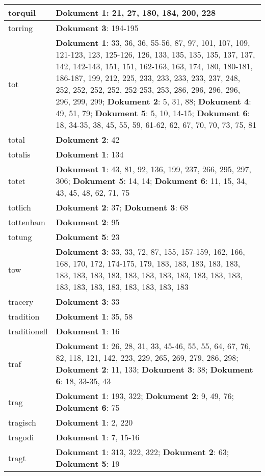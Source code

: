 \documentclass[a5paper]{article}
\begin{document}
\begin{longtable}[l]{|l|p{3in}|}
\hline
torquil & \textbf{Dokument 1}: 21, 27, 180, 184, 200, 228 \\
\hline
torring & \textbf{Dokument 3}: 194-195 \\
\hline
tot & \textbf{Dokument 1}: 33, 36, 36, 55-56, 87, 97, 101, 107, 109, 121-123, 123, 125-126, 126, 133, 135, 135, 135, 137, 137, 142, 142-143, 151, 151, 162-163, 163, 174, 180, 180-181, 186-187, 199, 212, 225, 233, 233, 233, 233, 237, 248, 252, 252, 252, 252, 252-253, 253, 286, 296, 296, 296, 296, 299, 299; \textbf{Dokument 2}: 5, 31, 88; \textbf{Dokument 4}: 49, 51, 79; \textbf{Dokument 5}: 5, 10, 14-15; \textbf{Dokument 6}: 18, 34-35, 38, 45, 55, 59, 61-62, 62, 67, 70, 70, 73, 75, 81 \\
\hline
total & \textbf{Dokument 2}: 42 \\
\hline
totalis & \textbf{Dokument 1}: 134 \\
\hline
totet & \textbf{Dokument 1}: 43, 81, 92, 136, 199, 237, 266, 295, 297, 306; \textbf{Dokument 5}: 14, 14; \textbf{Dokument 6}: 11, 15, 34, 43, 45, 48, 62, 71, 75 \\
\hline
totlich & \textbf{Dokument 2}: 37; \textbf{Dokument 3}: 68 \\
\hline
tottenham & \textbf{Dokument 2}: 95 \\
\hline
totung & \textbf{Dokument 5}: 23 \\
\hline
tow & \textbf{Dokument 3}: 33, 33, 72, 87, 155, 157-159, 162, 166, 168, 170, 172, 174-175, 179, 183, 183, 183, 183, 183, 183, 183, 183, 183, 183, 183, 183, 183, 183, 183, 183, 183, 183, 183, 183, 183, 183, 183, 183 \\
\hline
tracery & \textbf{Dokument 3}: 33 \\
\hline
tradition & \textbf{Dokument 1}: 35, 58 \\
\hline
traditionell & \textbf{Dokument 1}: 16 \\
\hline
traf & \textbf{Dokument 1}: 26, 28, 31, 33, 45-46, 55, 55, 64, 67, 76, 82, 118, 121, 142, 223, 229, 265, 269, 279, 286, 298; \textbf{Dokument 2}: 11, 133; \textbf{Dokument 3}: 38; \textbf{Dokument 6}: 18, 33-35, 43 \\
\hline
trag & \textbf{Dokument 1}: 193, 322; \textbf{Dokument 2}: 9, 49, 76; \textbf{Dokument 6}: 75 \\
\hline
tragisch & \textbf{Dokument 1}: 2, 220 \\
\hline
tragodi & \textbf{Dokument 1}: 7, 15-16 \\
\hline
tragt & \textbf{Dokument 1}: 313, 322, 322; \textbf{Dokument 2}: 63; \textbf{Dokument 5}: 19 \\

\end{longtable}
\end{document}
